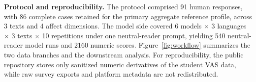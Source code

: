 \textbf{Protocol and reproducibility.} The protocol comprised 91 human responses, with 86 complete cases retained for the primary aggregate reference profile, across 3 texts and 4 affect dimensions. The model side covered 6 models $\times$ 3 languages $\times$ 3 texts $\times$ 10 repetitions under one neutral-reader prompt, yielding 540 neutral-reader model runs and 2160 numeric scores. Figure~\ref{fig:workflow} summarizes the two data branches and the downstream analysis. For reproducibility, the public repository stores only sanitized numeric derivatives of the student VAS data, while raw survey exports and platform metadata are not redistributed.

\begin{table}[t]
\caption{Primary benchmark design summary.}
\label{tab:design}
\centering

\end{table}
